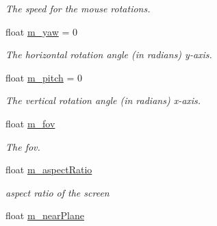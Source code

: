 \begin{CompactItemize}
\begin{CompactList}\small\item\em The speed for the mouse rotations. \item\end{CompactList}\item 
\hypertarget{class_camera_0f8807da02d4a1bb695be51793279873}{
float \hyperlink{class_camera_0f8807da02d4a1bb695be51793279873}{m\_\-yaw} = 0}
\label{class_camera_0f8807da02d4a1bb695be51793279873}

\begin{CompactList}\small\item\em The horizontal rotation angle (in radians) y-axis. \item\end{CompactList}\item 
\hypertarget{class_camera_2202e419e9440bbb26e6997248268b0b}{
float \hyperlink{class_camera_2202e419e9440bbb26e6997248268b0b}{m\_\-pitch} = 0}
\label{class_camera_2202e419e9440bbb26e6997248268b0b}

\begin{CompactList}\small\item\em The vertical rotation angle (in radians) x-axis. \item\end{CompactList}\item 
\hypertarget{class_camera_a404a4e057fa16fb82ce8668d7a661b6}{
float \hyperlink{class_camera_a404a4e057fa16fb82ce8668d7a661b6}{m\_\-fov}}
\label{class_camera_a404a4e057fa16fb82ce8668d7a661b6}

\begin{CompactList}\small\item\em The fov. \item\end{CompactList}\item 
\hypertarget{class_camera_9a5b3abea53ca97854696258029ee6cd}{
float \hyperlink{class_camera_9a5b3abea53ca97854696258029ee6cd}{m\_\-aspectRatio}}
\label{class_camera_9a5b3abea53ca97854696258029ee6cd}

\begin{CompactList}\small\item\em aspect ratio of the screen \item\end{CompactList}\item 
\hypertarget{class_camera_826a6508eec1868dbc1d57aa1c65e243}{
float \hyperlink{class_camera_826a6508eec1868dbc1d57aa1c65e243}{m\_\-nearPlane}}
\label{class_camera_826a6508eec1868dbc1d57aa1c65e243}


\end{CompactItemize}

